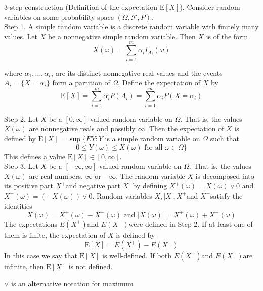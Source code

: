 \documentclass[11pt]{elegantbook}
\begin{document}
\begin{definition}{3 step construction}
(Definition of the expectation $\mathrm{E}[X]$). Consider random variables on some probability space $(\Omega, \mathcal{F}, P)$.\\

Step 1. A simple random variable is a discrete random variable with finitely many values. Let $X$ be a nonnegative simple random variable. Then $X$ is of the form
$$
X(\omega)=\sum_{i=1}^m \alpha_i I_{A_i}(\omega)
$$

where $\alpha_1, \ldots, \alpha_m$ are its distinct nonnegative real values and the events $A_i=\{X=\alpha_i\}$ form a partition of $\Omega$. Define the expectation of $X$ by
$$
\mathrm{E}[X]=\sum_{i=1}^m \alpha_i P\left(A_i\right)=\sum_{i=1}^m \alpha_i P\left(X=\alpha_i\right)
$$

Step 2. Let $X$ be a $[0, \infty]$-valued random variable on $\Omega$. That is, the values $X(\omega)$ are nonnegative reals and possibly $\infty$. Then the expectation of $X$ is defined by
$\mathrm{E}[X]=\sup \{E Y: Y$ is a simple random variable on $\Omega$ such that
$$
0 \leq Y(\omega) \leq X(\omega) \text { for all } \omega \in \Omega\}
$$
This defines a value $\mathrm{E}[X] \in[0, \infty]$.\\

Step 3. Let $X$ be a $[-\infty, \infty]$-valued random variable on $\Omega$. That is, the values $X(\omega)$ are real numbers, $\infty$ or $-\infty$. The random variable $X$ is decomposed into its positive part $X^{+}$and negative part $X^{-}$by defining $X^{+}(\omega)=X(\omega) \vee 0$ and $X^{-}(\omega)=(-X(\omega)) \vee 0$. Random variables $X,|X|, X^{+}$and $X^{-}$satisfy the identities
$$
X(\omega)=X^{+}(\omega)-X^{-}(\omega) \text { and }|X(\omega)|=X^{+}(\omega)+X^{-}(\omega)
$$
The expectations $E\left(X^{+}\right)$and $E\left(X^{-}\right)$were defined in Step 2. If at least one of them is finite, the expectation of $X$ is defined by
$$
\mathrm{E}[X]=E\left(X^{+}\right)-E\left(X^{-}\right)
$$
In this case we say that $\mathrm{E}[X]$ is well-defined. If both $E\left(X^{+}\right)$and $E\left(X^{-}\right)$are infinite, then $\mathrm{E}[X]$ is not defined.
\end{definition}
\begin{note}
    $\vee$ is an alternative notation for maximum
\end{note}
\end{document}

